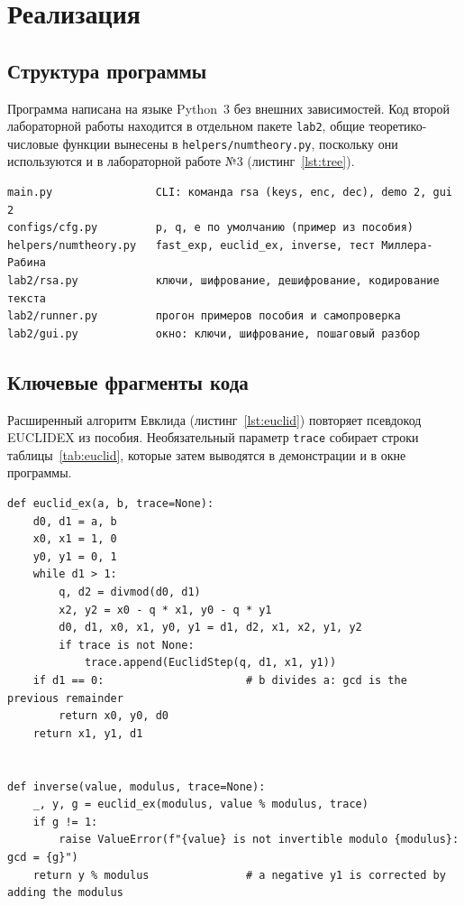 \documentclass[14pt,a4paper]{extarticle}
\begin{document}
\section{Реализация}

\subsection{Структура программы}

Программа написана на языке Python~3 без внешних зависимостей. Код второй
лабораторной работы находится в отдельном пакете \texttt{lab2}, общие
теоретико-числовые функции вынесены в \texttt{helpers/numtheory.py}, поскольку они
используются и в лабораторной работе №3 (листинг~\ref{lst:tree}).

\begin{Verbatim}[fontsize=\footnotesize, frame=single, samepage=true]
main.py                CLI: команда rsa (keys, enc, dec), demo 2, gui 2
configs/cfg.py         p, q, e по умолчанию (пример из пособия)
helpers/numtheory.py   fast_exp, euclid_ex, inverse, тест Миллера-Рабина
lab2/rsa.py            ключи, шифрование, дешифрование, кодирование текста
lab2/runner.py         прогон примеров пособия и самопроверка
lab2/gui.py            окно: ключи, шифрование, пошаговый разбор
\end{Verbatim}

\subsection{Ключевые фрагменты кода}

Расширенный алгоритм Евклида (листинг~\ref{lst:euclid}) повторяет псевдокод
EUCLIDEX из пособия. Необязательный параметр \texttt{trace} собирает строки
таблицы~\ref{tab:euclid}, которые затем выводятся в демонстрации и в окне программы.

\begin{lstlisting}[style=python, caption={Расширенный алгоритм Евклида}, label={lst:euclid}]
def euclid_ex(a, b, trace=None):
    d0, d1 = a, b
    x0, x1 = 1, 0
    y0, y1 = 0, 1
    while d1 > 1:
        q, d2 = divmod(d0, d1)
        x2, y2 = x0 - q * x1, y0 - q * y1
        d0, d1, x0, x1, y0, y1 = d1, d2, x1, x2, y1, y2
        if trace is not None:
            trace.append(EuclidStep(q, d1, x1, y1))
    if d1 == 0:                      # b divides a: gcd is the previous remainder
        return x0, y0, d0
    return x1, y1, d1


def inverse(value, modulus, trace=None):
    _, y, g = euclid_ex(modulus, value % modulus, trace)
    if g != 1:
        raise ValueError(f"{value} is not invertible modulo {modulus}: gcd = {g}")
    return y % modulus               # a negative y1 is corrected by adding the modulus
\end{lstlisting}
\end{document}
